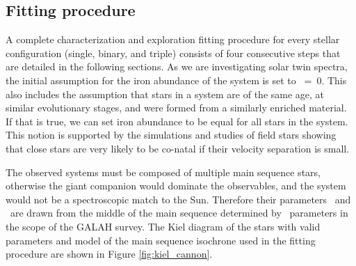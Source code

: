 \subsection{Fitting procedure}
A complete characterization and exploration fitting procedure for every stellar configuration (single, binary, and triple) consists of four consecutive steps that are detailed in the following sections. As we are investigating solar twin spectra, the initial assumption for the iron abundance of the system is set to \Feh~=~$0$. This also includes the assumption that stars in a system are of the same age, at similar evolutionary stages, and were formed from a similarly enriched material. If that is true, we can set iron abundance to be equal for all stars in the system. This notion is supported by the simulations \cite{2019arXiv190210719K} and studies \cite{2019arXiv190402159K} of field stars showing that close stars are very likely to be co-natal if their velocity separation is small.

The observed systems must be composed of multiple main sequence stars, otherwise the giant companion would dominate the observables, and the system would not be a spectroscopic match to the Sun. Therefore their parameters \Teff\ and \Logg\ are drawn from the middle of the main sequence determined by \TC\ parameters in the scope of the GALAH survey. The Kiel diagram of the stars with valid parameters and model of the main sequence isochrone used in the fitting procedure are shown in Figure \ref{fig:kiel_cannon}.

